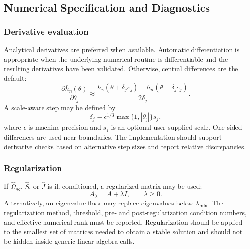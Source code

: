 \subsection{Numerical Specification and Diagnostics}
\label{app:numerical_specification}

\subsubsection{Derivative evaluation}

Analytical derivatives are preferred when available. Automatic differentiation
is appropriate when the underlying numerical routine is differentiable and the
resulting derivatives have been validated. Otherwise, central differences are
the default:
\begin{equation}
 \frac{\partial \overline h_n(\theta)}{\partial\theta_j}
 \approx
 \frac{
 \overline h_n(\theta+\delta_j e_j)
 -
 \overline h_n(\theta-\delta_j e_j)
 }{2\delta_j}.
 \label{eq:app_central_difference}
\end{equation}
A scale-aware step may be defined by
\begin{equation}
 \delta_j
 =
 \epsilon^{1/3}
 \max\{1,|\theta_j|\}
 s_j,
 \label{eq:app_fd_step}
\end{equation}
where $\epsilon$ is machine precision and $s_j$ is an optional user-supplied
scale. One-sided differences are used near boundaries. The implementation
should support derivative checks based on alternative step sizes and report
relative discrepancies.

\subsubsection{Regularization}

If $\widehat\Omega_{gg}$, $\widehat S$, or $\widehat J$ is ill-conditioned,
a regularized matrix may be used:
\begin{equation}
 A_{\lambda}
 =
 A+\lambda I,
 \qquad \lambda\geq0.
 \label{eq:app_ridge_regularization}
\end{equation}
Alternatively, an eigenvalue floor may replace eigenvalues below
$\lambda_{\min}$. The regularization method, threshold, pre- and
post-regularization condition numbers, and effective numerical rank must be
reported. Regularization should be applied to the smallest set of matrices
needed to obtain a stable solution and should not be hidden inside generic
linear-algebra calls.

